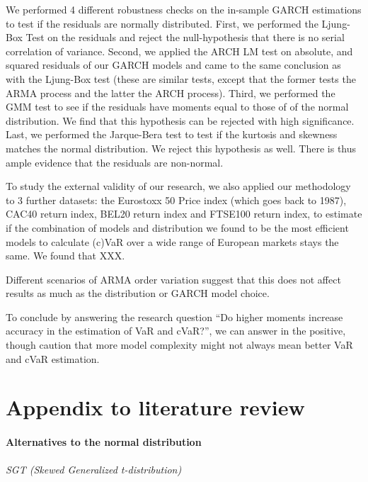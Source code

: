 \documentclass[a4paper, twoside]{templates/ociamthesis}
\begin{document}
We performed 4 different robustness checks on the in-sample GARCH estimations to test if the residuals are normally distributed. First, we performed the Ljung-Box Test on the residuals and reject the null-hypothesis that there is no serial correlation of variance. Second, we applied the ARCH LM test on absolute, and squared residuals of our GARCH models and came to the same conclusion as with the Ljung-Box test (these are similar tests, except that the former tests the ARMA process and the latter the ARCH process). Third, we performed the GMM test to see if the residuals have moments equal to those of of the normal distribution. We find that this hypothesis can be rejected with high significance. Last, we performed the Jarque-Bera test to test if the kurtosis and skewness matches the normal distribution. We reject this hypothesis as well. There is thus ample evidence that the residuals are non-normal.

To study the external validity of our research, we also applied our methodology to 3 further datasets: the Eurostoxx 50 Price index (which goes back to 1987), CAC40 return index, BEL20 return index and FTSE100 return index, to estimate if the combination of models and distribution we found to be the most efficient models to calculate (c)VaR over a wide range of European markets stays the same. We found that XXX.

Different scenarios of ARMA order variation suggest that this does not affect results as much as the distribution or GARCH model choice.

To conclude by answering the research question ``Do higher moments increase accuracy in the estimation of VaR and cVaR?'', we can answer in the positive, though caution that more model complexity might not always mean better VaR and cVaR estimation.

\startappendices

\hypertarget{appendix-to-literature-review}{%
\chapter{Appendix to literature review}\label{appendix-to-literature-review}}

\hypertarget{conditional-distributions}{%
\subsubsection{Alternatives to the normal distribution}\label{conditional-distributions}}

\hypertarget{sgtinfo}{%
\subparagraph{SGT (Skewed Generalized t-distribution)}\label{sgtinfo}}
\end{document}
